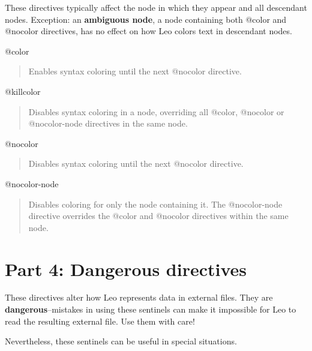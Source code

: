 \documentclass[a4paper,10pt,english]{sphinxmanual}
\begin{document}
These directives typically affect the node in which they appear and all
descendant nodes. Exception: an \textbf{ambiguous node}, a node containing both
@color and @nocolor directives, has no effect on how Leo colors text in
descendant nodes.
\begin{description}
\end{description}

@color
\begin{quote}

Enables syntax coloring until the next @nocolor directive.
\end{quote}

@killcolor
\begin{quote}

Disables syntax coloring in a node, overriding all @color, @nocolor or
@nocolor-node directives in the same node.
\end{quote}

@nocolor
\begin{quote}

Disables syntax coloring until the next @nocolor directive.
\end{quote}

@nocolor-node
\begin{quote}

Disables coloring for only the node containing it. The @nocolor-node
directive overrides the @color and @nocolor directives within the same
node.
\end{quote}


\section{Part 4: Dangerous directives}
\label{directives:part-4-dangerous-directives}
These directives alter how Leo represents data in external files. They are
\textbf{dangerous}--mistakes in using these sentinels can make it impossible for Leo
to read the resulting external file. Use them with care!

Nevertheless, these sentinels can be useful in special situations.
\begin{description}
\end{description}
\end{document}

